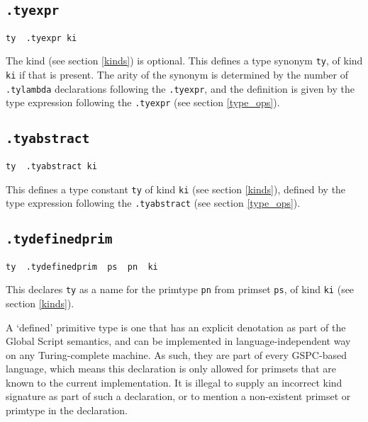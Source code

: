 \documentclass{report}
\newcommand\stringcode[1]{\texttt{#1}}
\begin{document}
\subsection{\stringcode{.tyexpr}}

\begin{verbatim}
ty	.tyexpr	ki
\end{verbatim}

The kind (see section \ref{kinds}) is optional.
This defines a type synonym \stringcode{ty}, of kind \stringcode{ki} if that is present.
The arity of the synonym is determined by the number of \stringcode{.tylambda} declarations following the \stringcode{.tyexpr},
and the definition is given by the type expression following the \stringcode{.tyexpr} (see section \ref{type_ops}).

\subsection{\stringcode{.tyabstract}}

\begin{verbatim}
ty	.tyabstract	ki
\end{verbatim}

This defines a type constant \stringcode{ty} of kind \stringcode{ki} (see section \ref{kinds}),
defined by the type expression following the \stringcode{.tyabstract} (see section \ref{type_ops}).

\subsection{\stringcode{.tydefinedprim}}

\begin{verbatim}
ty	.tydefinedprim	ps	pn	ki
\end{verbatim}

This declares \stringcode{ty} as a name for the primtype \stringcode{pn} from primset \stringcode{ps}, of kind \stringcode{ki} (see section \ref{kinds}).

A `defined' primitive type is one that has an explicit denotation as part of the Global Script semantics,
and can be implemented in  language-independent way on any Turing-complete machine.
As such, they are part of every GSPC-based language,
which means this declaration is only allowed for primsets that are known to the current implementation.
It is illegal to supply an incorrect kind signature as part of such a declaration,
or to mention a non-existent primset or primtype in the declaration.
\end{document}
